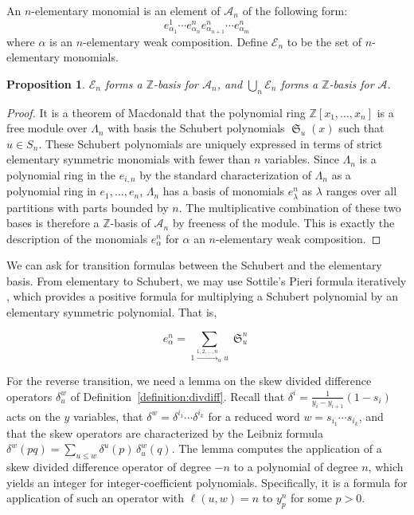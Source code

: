 \documentclass{amsart}
\newtheorem{proposition}[lemma]{Proposition}
\theoremstyle{definition}
\theoremstyle{remark}
\numberwithin{equation}{subsection}
\DeclareMathOperator{\sch}{\mathfrak{S}}
\newcommand{\coma}{\mathcal{A}}
\begin{document}
An $n$-elementary monomial is an element of $\coma_n$ of the following form: 
$$e_{\alpha_1}^{1}\cdots e_{\alpha_n}^ne_{\alpha_{n+1}}^n\cdots e_{\alpha_m}^n$$
where $\alpha$ is an $n$-elementary weak composition. Define $\mathcal{E}_n$ to be the set of $n$-elementary monomials.

\begin{proposition}
	$\mathcal{E}_n$ forms a $\mathbb{Z}$-basis for $\coma_n$, and $\bigcup_{n}\mathcal{E}_n$ forms a $\mathbb{Z}$-basis for $\coma$.
\end{proposition}
\begin{proof}
	It is a theorem of Macdonald that the polynomial ring $\mathbb{Z}[x_1,\ldots,x_n]$ is a free module over $\Lambda_n$ with basis the Schubert polynomials $\sch_u(x)$ such that $u\in S_n$. These Schubert polynomials are uniquely expressed in terms of strict elementary symmetric monomials with fewer than $n$ variables. Since $\Lambda_n$ is a polynomial ring in the $e_{i,n}$ by the standard characterization of $\Lambda_n$ as a polynomial ring in $e_1,\ldots,e_n$, $\Lambda_n$ has a basis of monomials $e_{\lambda}^n$ as $\lambda$ ranges over all partitions with parts bounded by $n$. The multiplicative combination of these two bases is therefore a $\mathbb{Z}$-basis of $\coma_n$ by freeness of the module. This is exactly the description of the monomials $e_{\alpha}^n$ for $\alpha$ an $n$-elementary weak composition.
\end{proof}

We can ask for transition formulas between the Schubert and the elementary basis. From elementary to Schubert, we may use Sottile's Pieri formula iteratively \cite{sottile}, which provides a positive formula for multiplying a Schubert polynomial by an elementary symmetric polynomial. That is,

$$e_{\alpha}^n = \sum_{1\xrightarrow{1,2,\ldots,n}_{\alpha} u}\sch_u^n$$

For the reverse transition, we need a lemma on the skew divided difference operators $\delta_u^w$ of Definition~\ref{definition:divdiff}. Recall that $\delta^i=\frac{1}{y_i-y_{i+1}}(1-s_i)$ acts on the $y$ variables, that $\delta^w=\delta^{i_1}\cdots\delta^{i_k}$ for a reduced word $w=s_{i_1}\cdots s_{i_k}$, and that the skew operators are characterized by the Leibniz formula $\delta^w(pq)=\sum_{u\leq w}\delta^u(p)\,\delta_u^w(q)$. The lemma computes the application of a skew divided difference operator of degree $-n$ to a polynomial of degree $n$, which yields an integer for integer-coefficient polynomials. Specifically, it is a formula for application of such an operator with $\ell(u,w)=n$ to $y_p^n$ for some $p>0$.
\end{document}
